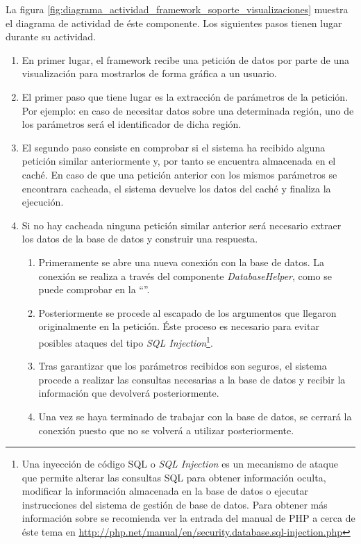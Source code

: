La figura \ref{fig:diagrama_actividad_framework_soporte_visualizaciones} muestra el diagrama de actividad de éste componente.  Los siguientes pasos tienen lugar durante su actividad.
\begin{enumerate}
	\item  En primer lugar, el framework recibe una petición de datos por parte de una visualización para mostrarlos de forma gráfica a un usuario.
	\item  El primer paso que tiene lugar es la extracción de parámetros de la petición.  Por ejemplo: en caso de necesitar datos sobre una determinada región, uno de los parámetros será el identificador de dicha región.
	\item  El segundo paso consiste en comprobar si el sistema ha recibido alguna petición similar anteriormente y, por tanto se encuentra almacenada en el caché.  En caso de que una petición anterior con los mismos parámetros se encontrara cacheada, el sistema devuelve los datos del caché y finaliza la ejecución.
	\item  Si no hay cacheada ninguna petición similar anterior será necesario extraer los datos de la base de datos y construir una respuesta.
		\begin{enumerate}
			\item  Primeramente se abre una nueva conexión con la base de datos.  La conexión se realiza a través del componente \textit{DatabaseHelper}, como se puede comprobar en la ``''.
			\item  Posteriormente se procede al escapado de los argumentos que llegaron originalmente en la petición.  Éste proceso es necesario para evitar posibles ataques del tipo \textit{SQL Injection}\footnote{Una inyección de código SQL o \textit{SQL Injection} es un mecanismo de ataque que permite alterar las consultas SQL para obtener información oculta, modificar la información almacenada en la base de datos o ejecutar instrucciones del sistema de gestión de base de datos.  Para obtener más información sobre se recomienda ver la entrada del manual de PHP a cerca de éste tema en \url{http://php.net/manual/en/security.database.sql-injection.php}}.
			\item  Tras garantizar que los parámetros recibidos son seguros, el sistema procede a realizar las consultas necesarias a la base de datos y recibir la información que devolverá posteriormente.
			\item  Una vez se haya terminado de trabajar con la base de datos, se cerrará la conexión puesto que no se volverá a utilizar posteriormente.

\end{enumerate}
\end{enumerate}
